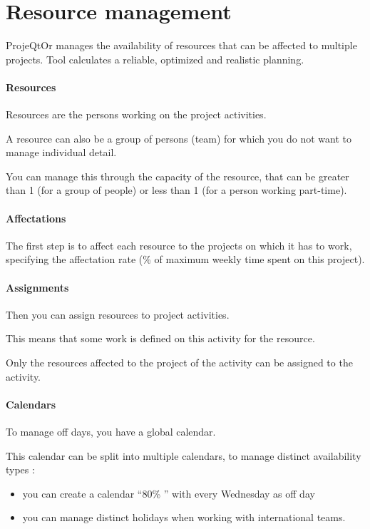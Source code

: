 \documentclass[letterpaper,10pt,english]{sphinxmanual}
\begin{document}
\section{Resource management}
\label{Features:resource-management}\label{Features:index-8}
ProjeQtOr  manages the availability of resources that can be affected to multiple projects. Tool calculates a reliable, optimized and realistic planning.

\paragraph{Resources}

Resources are the persons working on the project activities.

A resource can also be a group of persons (team) for which you do not want to manage individual detail.

You can manage this through the capacity of the resource, that can be greater than 1 (for a group of people) or less than 1 (for a person working part-time).

\paragraph{Affectations}

The first step is to affect each resource to the projects on which it has to work, specifying the affectation rate (\% of maximum weekly time spent on this project).

\paragraph{Assignments}

Then you can assign resources to project activities.

This means that some work is defined on this activity for the resource.

Only the resources affected to the project of the activity can be assigned to the activity.

\paragraph{Calendars}

To manage off days, you have a global calendar.

This calendar can be split into multiple calendars, to manage distinct availability types :
\begin{itemize}
\item {} 
you can create a calendar ``80\% '' with every Wednesday as off day

\item {} 
you can manage distinct holidays when working with international teams.

\end{itemize}
\end{document}
